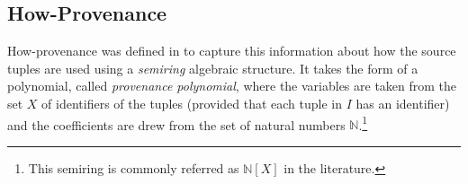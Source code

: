 \documentclass[preprint,12pt,sort&compress]{elsarticle}
\newcommand{\rtwo}[1]{\textcolor{reviewer2}{#1}}
\begin{document}
 


\subsection{How-Provenance}
\label{section:how_provenance_tuples}

How-provenance was defined in \citep{howProvenanceGreen} to capture this information about how the source tuples are used using a \emph{semiring} algebraic structure.
It takes the form of a polynomial, called \emph{provenance polynomial}, where the variables are taken from the set $X$ of identifiers of the tuples (provided that each tuple in $I$ has an identifier) and the coefficients are drew from the set of natural numbers $\mathbb{N}$.\footnote{\rtwo{This semiring is commonly referred as $\mathbb{N}[X]$ in the literature.}}
\end{document}
